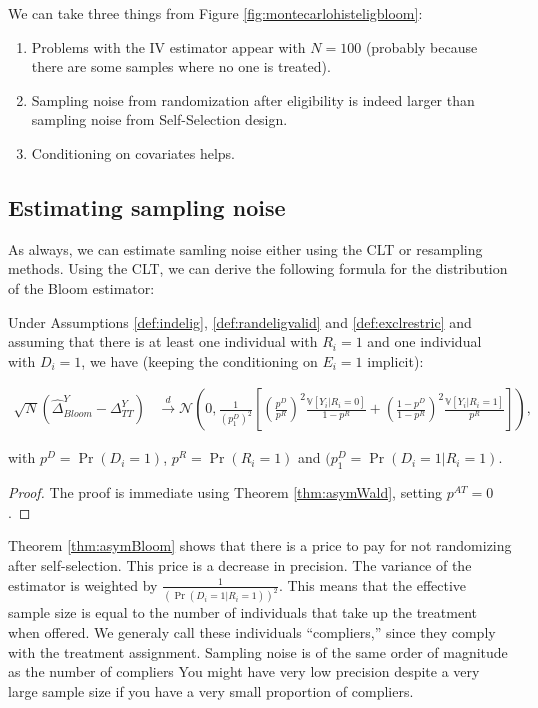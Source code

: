 \documentclass[]{book}
\providecommand{\tightlist}{%
  \setlength{\itemsep}{0pt}\setlength{\parskip}{0pt}}
\newcommand{\var}[1]{\mathbb{V}[ #1 ]}
\theoremstyle{definition}
\theoremstyle{definition}
\theoremstyle{definition}
\theoremstyle{remark}
\let\BeginKnitrBlock\begin \let\EndKnitrBlock\end
\begin{document}
We can take three things from Figure \ref{fig:montecarlohisteligbloom}:

\begin{enumerate}
\def\labelenumi{\arabic{enumi}.}
\tightlist
\item
  Problems with the IV estimator appear with \(N=100\) (probably because
  there are some samples where no one is treated).
\item
  Sampling noise from randomization after eligibility is indeed larger
  than sampling noise from Self-Selection design.
\item
  Conditioning on covariates helps.
\end{enumerate}

\subsection{Estimating sampling
noise}\label{estimating-sampling-noise-2}

As always, we can estimate samling noise either using the CLT or
resampling methods. Using the CLT, we can derive the following formula
for the distribution of the Bloom estimator:

\BeginKnitrBlock{theorem}[Asymptotic Distribution of $\hat{\Delta}^Y_{Bloom}$]
\protect\hypertarget{thm:asymBloom}{}{\label{thm:asymBloom}
\iffalse (Asymptotic Distribution of \(\hat{\Delta}^Y_{Bloom}\)) \fi{}
}Under Assumptions \ref{def:indelig}, \ref{def:randeligvalid} and
\ref{def:exclrestric} and assuming that there is at least one individual
with \(R_i=1\) and one individual with \(D_i=1\), we have (keeping the
conditioning on \(E_i=1\) implicit):

\begin{align*}
  \sqrt{N}(\hat{\Delta}^Y_{Bloom}-\Delta^Y_{TT}) &  \stackrel{d}{\rightarrow}
  \mathcal{N}\left(0,\frac{1}{(p^{D}_1)^2}\left[\left(\frac{p^D}{p^R}\right)^2\frac{\var{Y_i|R_i=0}}{1-p^R}+\left(\frac{1-p^D}{1-p^R}\right)^2\frac{\var{Y_i|R_i=1}}{p^R}\right]\right),
\end{align*}
\EndKnitrBlock{theorem}

with \(p^D=\Pr(D_i=1)\), \(p^R=\Pr(R_i=1)\) and
\((p^{D}_1=\Pr(D_i=1|R_i=1)\).

\BeginKnitrBlock{proof}
\iffalse{} {Proof. } \fi{}The proof is immediate using Theorem
\ref{thm:asymWald}, setting \(p^{AT}=0\).
\EndKnitrBlock{proof}

\BeginKnitrBlock{remark}
\iffalse{} {Remark. } \fi{}Theorem \ref{thm:asymBloom} shows that there
is a price to pay for not randomizing after self-selection. This price
is a decrease in precision. The variance of the estimator is weighted by
\(\frac{1}{(\Pr(D_i=1|R_i=1))^2}\). This means that the effective sample
size is equal to the number of individuals that take up the treatment
when offered. We generaly call these individuals ``compliers,'' since
they comply with the treatment assignment. Sampling noise is of the same
order of magnitude as the number of compliers You might have very low
precision despite a very large sample size if you have a very small
proportion of compliers.
\EndKnitrBlock{remark}
\end{document}
